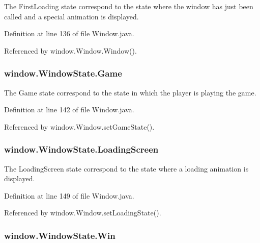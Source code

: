The First\-Loading state correspond to the state where the window has just been called and a special animation is displayed. 



Definition at line 136 of file Window.\-java.



Referenced by window.\-Window.\-Window().

\hypertarget{a00038_abb4a2512f88d7104f91993174488282d}{
\subsubsection[{Game}]{\setlength{\rightskip}{0pt plus 5cm}window.\-Window\-State.\-Game}}\label{a00038_abb4a2512f88d7104f91993174488282d}


The Game state correspond to the state in which the player is playing the game. 



Definition at line 142 of file Window.\-java.



Referenced by window.\-Window.\-set\-Game\-State().

\hypertarget{a00038_a281f52964a4be64ea19bf2a401184521}{
\subsubsection[{Loading\-Screen}]{\setlength{\rightskip}{0pt plus 5cm}window.\-Window\-State.\-Loading\-Screen}}\label{a00038_a281f52964a4be64ea19bf2a401184521}


The Loading\-Screen state correspond to the state where a loading animation is displayed. 



Definition at line 149 of file Window.\-java.



Referenced by window.\-Window.\-set\-Loading\-State().

\hypertarget{a00038_adfd70a04c81f1ff3b289d5b766206fb5}{
\subsubsection[{Win}]{\setlength{\rightskip}{0pt plus 5cm}window.\-Window\-State.\-Win}}\label{a00038_adfd70a04c81f1ff3b289d5b766206fb5}


